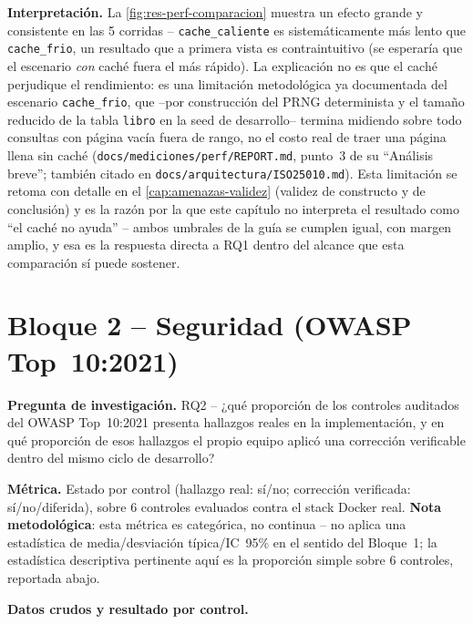 \textbf{Interpretación.} La \autoref{fig:res-perf-comparacion} muestra un
efecto grande y consistente en las 5 corridas -- \texttt{cache\_caliente}
es sistemáticamente más lento que \texttt{cache\_frio}, un resultado que
a primera vista es contraintuitivo (se esperaría que el escenario
\emph{con} caché fuera el más rápido). La explicación no es que el caché
perjudique el rendimiento: es una limitación metodológica ya documentada
del escenario \texttt{cache\_frio}, que --por construcción del PRNG
determinista y el tamaño reducido de la tabla \texttt{libro} en la seed
de desarrollo-- termina midiendo sobre todo consultas con página vacía
fuera de rango, no el costo real de traer una página llena sin caché
(\texttt{docs/mediciones/perf/REPORT.md}, punto~3 de su ``Análisis
breve''; también citado en \texttt{docs/arquitectura/ISO25010.md}). Esta
limitación se retoma con detalle en el \autoref{cap:amenazas-validez}
(validez de constructo y de conclusión) y es la razón por la que este
capítulo no interpreta el resultado como ``el caché no ayuda'' -- ambos
umbrales de la guía se cumplen igual, con margen amplio, y esa es la
respuesta directa a RQ1 dentro del alcance que esta comparación sí puede
sostener.

\section{Bloque 2 -- Seguridad (OWASP Top~10:2021)}
\label{sec:res-seguridad}

\textbf{Pregunta de investigación.} RQ2 -- ¿qué proporción de los
controles auditados del OWASP Top~10:2021 presenta hallazgos reales en la
implementación, y en qué proporción de esos hallazgos el propio equipo
aplicó una corrección verificable dentro del mismo ciclo de desarrollo?

\textbf{Métrica.} Estado por control (hallazgo real: sí/no; corrección
verificada: sí/no/diferida), sobre 6 controles evaluados contra el stack
Docker real. \textbf{Nota metodológica}: esta métrica es categórica, no
continua -- no aplica una estadística de media/desviación típica/IC~95\%
en el sentido del Bloque~1; la estadística descriptiva pertinente aquí es
la proporción simple sobre 6 controles, reportada abajo.

\textbf{Datos crudos y resultado por control.}

